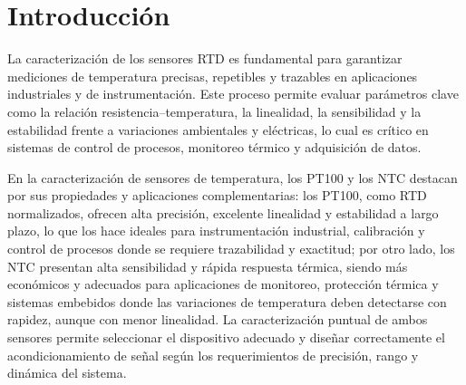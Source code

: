\section*{Introducción}

La caracterización de los sensores RTD es fundamental para garantizar mediciones de temperatura precisas, repetibles y trazables en aplicaciones industriales y de instrumentación. Este proceso permite evaluar parámetros clave como la relación resistencia–temperatura, la linealidad, la sensibilidad y la estabilidad frente a variaciones ambientales y eléctricas, lo cual es crítico en sistemas de control de procesos, monitoreo térmico y adquisición de datos.

En la caracterización de sensores de temperatura, los PT100 y los NTC destacan por sus propiedades y aplicaciones complementarias: los PT100, como RTD normalizados, ofrecen alta precisión, excelente linealidad y estabilidad a largo plazo, lo que los hace ideales para instrumentación industrial, calibración y control de procesos donde se requiere trazabilidad y exactitud; por otro lado, los NTC presentan alta sensibilidad y rápida respuesta térmica, siendo más económicos y adecuados para aplicaciones de monitoreo, protección térmica y sistemas embebidos donde las variaciones de temperatura deben detectarse con rapidez, aunque con menor linealidad. La caracterización puntual de ambos sensores permite seleccionar el dispositivo adecuado y diseñar correctamente el acondicionamiento de señal según los requerimientos de precisión, rango y dinámica del sistema.